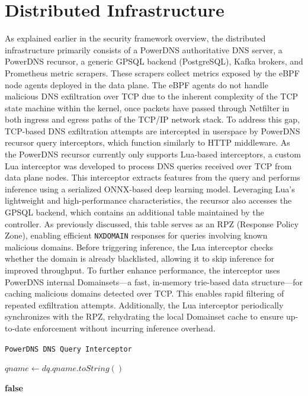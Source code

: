 \documentclass [11pt, proquest] {uwthesis}[2020/02/24]
\begin{document}
\section{Distributed Infrastructure }
As explained earlier in the security framework overview, the distributed infrastructure primarily consists of a PowerDNS authoritative DNS server, a PowerDNS recursor, a generic GPSQL backend (PostgreSQL), Kafka brokers, and Prometheus metric scrapers. These scrapers collect metrics exposed by the eBPF node agents deployed in the data plane. The eBPF agents do not handle malicious DNS exfiltration over TCP due to the inherent complexity of the TCP state machine within the kernel, once packets have passed through Netfilter in both ingress and egress paths of the TCP/IP network stack. To address this gap, TCP-based DNS exfiltration attempts are intercepted in userspace by PowerDNS recursor query interceptors, which function similarly to HTTP middleware. As the PowerDNS recursor currently only supports Lua-based interceptors, a custom Lua interceptor was developed to process DNS queries received over TCP from data plane nodes. This interceptor extracts features from the query and performs inference using a serialized ONNX-based deep learning model. Leveraging Lua’s lightweight and high-performance characteristics, the recursor also accesses the GPSQL backend, which contains an additional table maintained by the controller. As previously discussed, this table serves as an RPZ (Response Policy Zone), enabling efficient \texttt{NXDOMAIN} responses for queries involving known malicious domains. Before triggering inference, the Lua interceptor checks whether the domain is already blacklisted, allowing it to skip inference for improved throughput. To further enhance performance, the interceptor uses PowerDNS internal Domainsets—a fast, in-memory trie-based data structure—for caching malicious domains detected over TCP. This enables rapid filtering of repeated exfiltration attempts. Additionally, the Lua interceptor periodically synchronizes with the RPZ, rehydrating the local Domainset cache to ensure up-to-date enforcement without incurring inference overhead.

\begin{algorithm}[H]
\caption{\texttt{PowerDNS DNS Query Interceptor}}
$qname \gets dq.qname.toString()$\;

\small %

\Return \textbf{false}\;
\end{algorithm}
\end{document}
